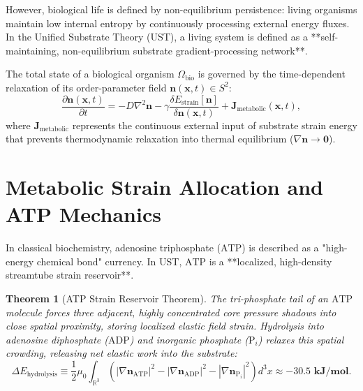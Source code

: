 \documentclass[11pt,a4paper]{article}
\newtheorem{thm}{Theorem}
\begin{document}
	However, biological life is defined by non-equilibrium persistence: living organisms maintain low internal entropy by continuously processing external energy fluxes. In the Unified Substrate Theory (UST), a living system is defined as a **self-maintaining, non-equilibrium substrate gradient-processing network**.
	
	The total state of a biological organism $\Omega_{\text{bio}}$ is governed by the time-dependent relaxation of its order-parameter field $\mathbf{n}(\mathbf{x}, t) \in S^2$:
	\begin{equation}
		\frac{\partial \mathbf{n}(\mathbf{x}, t)}{\partial t} = -D \nabla^2 \mathbf{n} - \gamma \frac{\delta E_{\text{strain}}[\mathbf{n}]}{\delta \mathbf{n}(\mathbf{x}, t)} + \mathbf{J}_{\text{metabolic}}(\mathbf{x}, t),
		\label{eq:living_system_field_equation}
	\end{equation}
	where $\mathbf{J}_{\text{metabolic}}$ represents the continuous external input of substrate strain energy that prevents thermodynamic relaxation into thermal equilibrium ($\nabla \mathbf{n} \to \mathbf{0}$).
	
	\section{Metabolic Strain Allocation and ATP Mechanics}
	\label{sec:metabolism_atp}
	
	In classical biochemistry, adenosine triphosphate ($\text{ATP}$) is described as a "high-energy chemical bond" currency. In UST, $\text{ATP}$ is a **localized, high-density streamtube strain reservoir**.
	
	\begin{thm}[ATP Strain Reservoir Theorem]
		\label{thm:atp_strain_reservoir}
		The tri-phosphate tail of an $\text{ATP}$ molecule forces three adjacent, highly concentrated core pressure shadows into close spatial proximity, storing localized elastic field strain. Hydrolysis into adenosine diphosphate ($\text{ADP}$) and inorganic phosphate ($\text{P}_i$) relaxes this spatial crowding, releasing net elastic work into the substrate:
		\begin{equation}
			\Delta E_{\text{hydrolysis}} \equiv \frac{1}{2}\mu_0 \int_{\mathbb{R}^3} \left( \left| \nabla \mathbf{n}_{\text{ATP}} \right|^2 - \left| \nabla \mathbf{n}_{\text{ADP}} \right|^2 - \left| \nabla \mathbf{n}_{\text{P}_i} \right|^2 \right) d^3x \approx -\mathbf{30.5 \text{ kJ/mol}}.
			\label{eq:atp_hydrolysis_strain}
		\end{equation}
	\end{thm}
	
\end{document}
